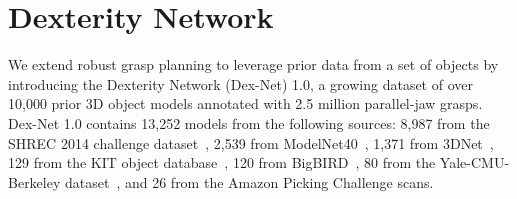 \section{Dexterity Network}

We extend robust grasp planning to leverage prior data from a set of objects by introducing the Dexterity Network (Dex-Net) 1.0, a growing dataset of over 10,000 prior 3D object models annotated with 2.5 million parallel-jaw grasps.
Dex-Net 1.0 contains 13,252 models from the following sources: 8,987 from the SHREC 2014 challenge dataset~\cite{li2015comparison}, 2,539 from ModelNet40~\cite{wu20153d}, 1,371 from 3DNet~\cite{wohlkinger20123dnet}, 129 from the KIT object database~\cite{kasper2012kit}, 120 from BigBIRD~\cite{singh2014bigbird}, 80 from the Yale-CMU-Berkeley dataset~\cite{calli2015benchmarking}, and 26 from the Amazon Picking Challenge scans.


%

